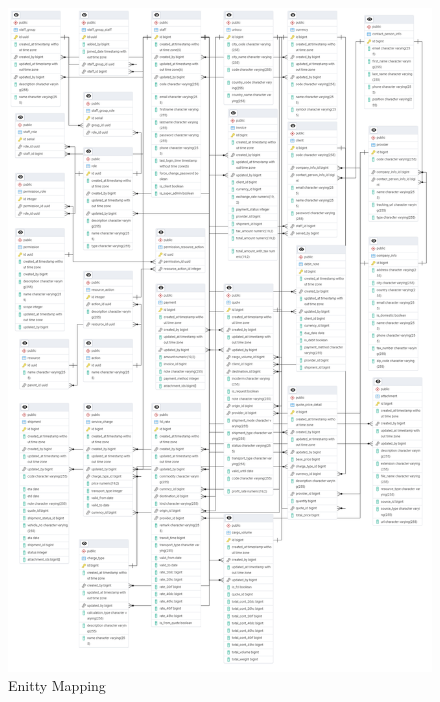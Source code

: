 \begin{figure}[H]
    \centering
    \includegraphics[width=\textwidth, height=\textheight, keepaspectratio]{graphics/DB/entity-mapping.png}
    \caption{Enitty Mapping}
    \label{fig:entity-mapping}
\end{figure}
